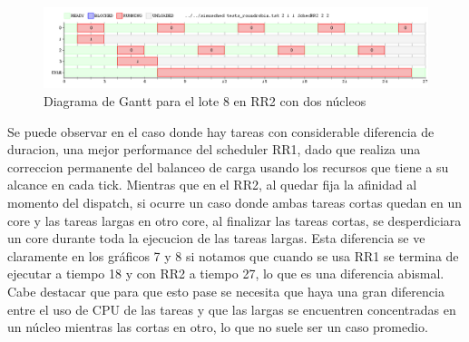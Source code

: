 \documentclass{article}
\begin{document}
  \begin{figure}
  \includegraphics[scale=0.32]{ej8_RR2.png}
  \caption{Diagrama de Gantt para el lote 8 en RR2 con dos n\'ucleos}
  \end{figure}
 
  Se puede observar en el caso donde hay tareas con considerable diferencia de duracion, una mejor performance del scheduler RR1, dado que realiza una correccion permanente del balanceo de carga usando los recursos que tiene a su alcance en cada tick. Mientras que en el RR2, al quedar fija la afinidad al momento del dispatch, si ocurre un caso donde ambas tareas cortas quedan en un core y las tareas largas en otro core, al finalizar las tareas cortas, se desperdiciara un core durante toda la ejecucion de las tareas largas.
  Esta diferencia se ve claramente en los gr\'aficos 7 y 8 si notamos que cuando se usa RR1 se termina de ejecutar a tiempo 18 y con RR2 a tiempo 27, lo que es una diferencia abismal. Cabe destacar que para que esto pase se necesita
  que haya una gran diferencia entre el uso de CPU de las tareas y que las largas se encuentren concentradas en un n\'ucleo mientras las cortas en otro, lo que no suele ser un caso promedio.
\end{document}
